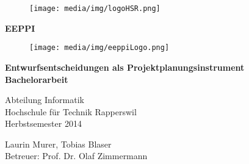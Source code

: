 \documentclass[ngerman,a4paper,12pt]{scrreprt}
\author{Laurin Murer, Tobias Blaser}
\title{\documentType \project}
\date{\today{}, Rapperswil}
\providecommand{\project}{Entwurfsentscheidungen als Projektplanungsinstrument}
\providecommand{\teacher}{Prof. Dr. Olaf Zimmermann}
\begin{document}
\thispagestyle{empty}
\begin{titlepage}
	\begin{figure}[htp]
		\texttt{[image: media/img/logoHSR.png]}
	\end{figure}	
	
	\begin{center}

		\vspace*{0.5cm}
		{\fontsize{50}{40} \selectfont \textbf{EEPPI} \\[10mm]}
	
		\begin{figure}[htp]
			\centering
			\texttt{[image: media/img/eeppiLogo.png]}
		\end{figure}		
		\vspace*{1cm}	
	
		{\fontsize{28}{40} \selectfont \textbf{\project} \\[10mm]}
		{\fontsize{22}{40} \selectfont \textbf{Bachelorarbeit} \\[10mm]}
	
		{\fontsize{18}{20} \selectfont 
			Abteilung Informatik\\
			Hochschule für Technik Rapperswil \\
				
			\vspace*{1cm}
			Herbstsemester 2014\\
		}
		
		\vspace*{2cm}
		Laurin Murer, Tobias Blaser \\
		Betreuer: \teacher

	\end{center}
\end{titlepage}
\clearpage











\tableofcontents
%



\end{document}
